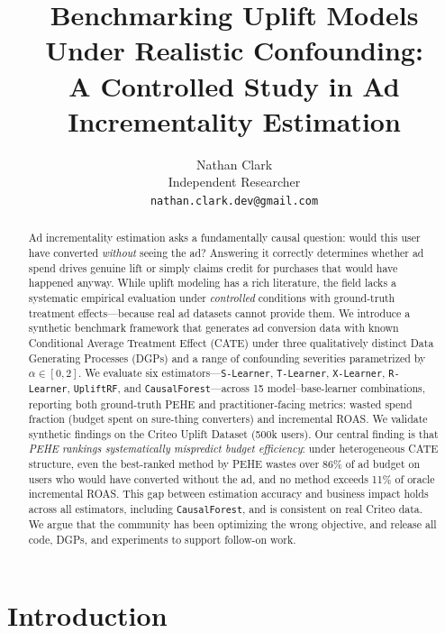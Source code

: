 \documentclass[10pt]{article}
\title{%
  \textbf{Benchmarking Uplift Models Under Realistic Confounding:}\\
  \textbf{A Controlled Study in Ad Incrementality Estimation}
}
\author{%
  Nathan Clark\\
  Independent Researcher\\
  \texttt{nathan.clark.dev@gmail.com}
}
\date{}
\newcommand{\slearner}{\texttt{S-Learner}\xspace}
\newcommand{\tlearner}{\texttt{T-Learner}\xspace}
\newcommand{\xlearner}{\texttt{X-Learner}\xspace}
\newcommand{\rlearner}{\texttt{R-Learner}\xspace}
\newcommand{\upliftrf}{\texttt{UpliftRF}\xspace}
\newcommand{\causalforest}{\texttt{CausalForest}\xspace}
\begin{document}
\maketitle

\begin{abstract}
Ad incrementality estimation asks a fundamentally causal question: would this
user have converted \emph{without} seeing the ad? Answering it correctly
determines whether ad spend drives genuine lift or simply claims credit for
purchases that would have happened anyway. While uplift modeling has a rich
literature, the field lacks a systematic empirical evaluation under
\emph{controlled} conditions with ground-truth treatment effects---because real
ad datasets cannot provide them. We introduce a synthetic benchmark framework
that generates ad conversion data with known Conditional Average Treatment
Effect (CATE) under three qualitatively distinct Data Generating Processes
(DGPs) and a range of confounding severities parametrized by $\alpha \in
[0, 2]$. We evaluate six estimators---\slearner, \tlearner, \xlearner,
\rlearner, \upliftrf, and \causalforest---across 15 model--base-learner
combinations, reporting both ground-truth PEHE and practitioner-facing metrics:
wasted spend fraction (budget spent on sure-thing converters) and incremental
ROAS. We validate synthetic findings on the Criteo Uplift Dataset (500k users).
Our central finding is that \emph{PEHE rankings systematically mispredict
budget efficiency}: under heterogeneous CATE structure, even the best-ranked
method by PEHE wastes over 86\% of ad budget on users who would have converted
without the ad, and no method exceeds 11\% of oracle incremental ROAS. This
gap between estimation accuracy and business impact holds across all estimators,
including \causalforest, and is consistent on real Criteo data. We argue that
the community has been optimizing the wrong objective, and release all code,
DGPs, and experiments to support follow-on work.
\end{abstract}

\section{Introduction}
\label{sec:intro}
\end{document}
